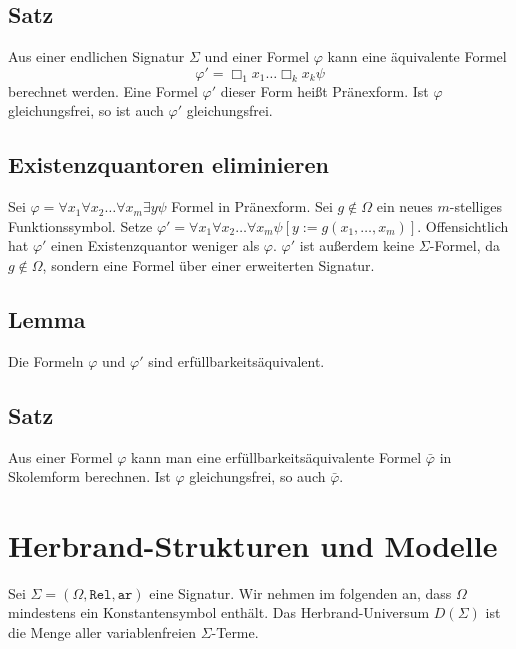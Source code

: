 \documentclass[12pt,a4paper]{report}
\newcommand{\ls}{\newline\newline}
\newcommand{\red}[1]{\textcolor[rgb]{0.9,0.2,0.2}{#1}}
\newcommand{\green}[1]{\textcolor[rgb]{0.1,0.6,0.1}{#1}}
\newcommand{\blue}[1]{\textcolor[rgb]{0.2,0.2,1}{#1}}
\begin{document}
\subsection{\green{Satz}}
Aus einer endlichen Signatur $ \Sigma $ und einer Formel $ \varphi $ kann eine äquivalente Formel
\[
    \varphi' = \Box_1x_1\dots\Box_kx_k \psi
\]
berechnet werden. Eine Formel $ \varphi' $ dieser Form heißt \red{Pränexform}.\ls
Ist $ \varphi $ gleichungsfrei, so ist auch $ \varphi' $ gleichungsfrei.

\subsection{\red{Existenzquantoren eliminieren}}
Sei $ \varphi = \forall x_1 \forall x_2\dots\forall x_m \exists y \psi $ Formel in Pränexform. Sei $ g \notin \Omega $ ein neues $ m $-stelliges Funktionssymbol.\ls
Setze \red{$ \varphi' $}$ = \forall x_1 \forall x_2\dots \forall x_m \psi [y := g(x_1,\dots,x_m)] $.\ls
Offensichtlich hat $ \varphi' $ einen Existenzquantor weniger als $ \varphi $. $ \varphi' $ ist außerdem keine $ \Sigma $-Formel, da $ g \notin \Omega $, sondern eine Formel über einer erweiterten Signatur.

\subsection{\green{Lemma}}
Die Formeln $ \varphi $ und $ \varphi' $ sind erfüllbarkeitsäquivalent.
\subsection{\green{Satz}}
Aus einer Formel $ \varphi $ kann man eine erfüllbarkeitsäquivalente Formel $ \bar{\varphi}  $ in Skolemform berechnen. \newline
Ist $ \varphi $ gleichungsfrei, so auch $ \bar \varphi $.

\section{\blue{Herbrand-Strukturen und Modelle}}
Sei $ \Sigma = (\Omega, \texttt{Rel}, \texttt{ar})$ eine Signatur. Wir nehmen im folgenden an, dass $ \Omega $ mindestens ein Konstantensymbol enthält. \ls
Das \red{Herbrand-Universum $  D(\Sigma) $} ist die Menge aller variablenfreien $ \Sigma $-Terme. \ls
\end{document}
